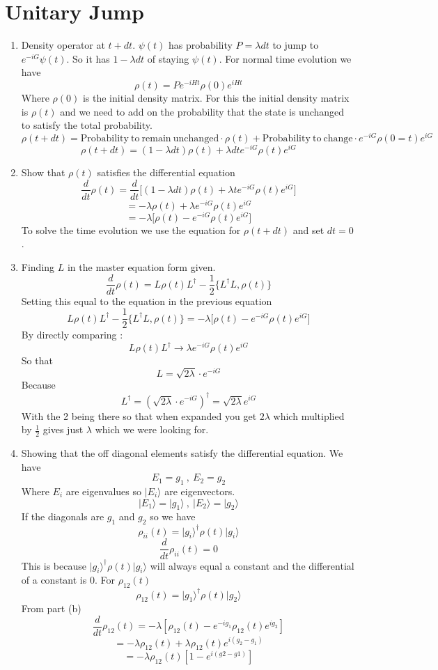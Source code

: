 \documentclass[12pt]{article}
\newcommand{\ket}[1]{\vert{#1}\rangle}
\begin{document}
\section{Unitary Jump}
\begin{enumerate}
    \item Density operator at $t +dt$. $\psi (t)$ has probability $P= \lambda dt$ to jump to $e^{-i G} \psi (t) $. So it has $1-\lambda dt$ of staying $\psi (t)$.
    For normal time evolution we have 
    $$ \rho (t) = P e^{-i Ht} \rho(0) e^{iHt} $$
    Where $\rho (0)$ is the initial density matrix. For this the initial density matrix is $\rho (t)$ and we need to add on the probability that the state is unchanged to satisfy the total probability.
    $$ \rho (t +dt) = \mathrm{Probability \ to \ remain \ unchanged} \cdot \rho (t) + \mathrm{Probability\ to \ change} \cdot e^{-iG} \rho (0=t) e^{iG} $$
    $$ \rho (t +dt) = (1-\lambda dt) \rho (t) + \lambda dt e^{-iG} \rho (t) e^{iG} $$

    \item Show that $\rho (t)$ satisfies the differential equation 
    $$ \frac{d}{dt} \rho (t) = \frac{d}{dt} \Big[ (1-\lambda dt) \rho (t) + \lambda t e^{-iG} \rho (t) e^{iG} \Big] $$
    $$ = - \lambda \rho (t) + \lambda e^{-iG} \rho (t) e^{iG} $$ 
    $$ = - \lambda \Big[ \rho (t) - e^{-iG} \rho (t) e^{iG} \Big] $$
    To solve the time evolution we use the equation for $\rho (t + dt)$ and set $dt = 0$.
    
    \item Finding $L$ in the master equation form given.
    $$ \frac{d}{dt} \rho (t) = L \rho (t) L^{\dagger} - \frac{1}{2} \{L^{\dagger}L, \rho (t) \} $$
    Setting this equal to the equation in the previous equation 
    $$  L \rho (t) L^{\dagger} - \frac{1}{2} \{L^{\dagger}L, \rho (t) \} = - \lambda \Big[ \rho (t) - e^{-iG} \rho (t) e^{iG} \Big] $$
    By directly comparing :
    $$ L \rho (t) L^{\dagger} \rightarrow \lambda e^{-iG} \rho (t) e^{iG} $$
    So that 
    $$ L = \sqrt{2 \lambda} \cdot e^{-iG} $$
    Because 
    $$ L^{\dagger} = (\sqrt{2 \lambda} \cdot e^{-iG} )^{\dagger} = \sqrt{2 \lambda} e^{iG} $$
    With the 2 being there so that when expanded you get $2 \lambda$ which multiplied by $\frac{1}{2}$ gives just $\lambda$ which we were looking for. 
    \item Showing that the off diagonal elements satisfy the differential equation. We have 
    $$ E_1 = g_1 \ , \ E_2 = g_2 $$
    Where $E_i$ are eigenvalues so $\ket{E_i}$ are eigenvectors. 
    $$ \ket{E_1} = \ket{g_1} \ , \ \ket{E_2} = \ket{g_2} $$
    If the diagonals are $g_1$ and $g_2$ so we have 
    $$ \rho_{ii} (t) = \ket{g_i}^{\dagger} \rho (t) \ket{g_i} $$
    $$ \frac{d}{dt} \rho_{ii} (t) = 0 $$
    This is because $\ket{g_i}^{\dagger} \rho (t) \ket{g_i} $ will always equal a constant and the differential of a constant is 0. 
    For $\rho_{12} (t)$ 
    $$ \rho_{12} (t) = \ket{g_1}^{\dagger} \rho(t) \ket{g_2} $$
    From part (b) 
    $$ \frac{d}{dt} \rho_{12} (t) = -\lambda [ \rho_{12} (t) - e^{-i g_1} \rho_{12} (t) e^{ig_2} ] $$
    $$ = -\lambda \rho_{12} (t) + \lambda \rho_{12} (t) e^{i(g_2-g_1)} $$
    $$ = -\lambda \rho_{12} (t) [ 1- e^{i(g2-g1)}] $$





\end{enumerate}
\end{document}
